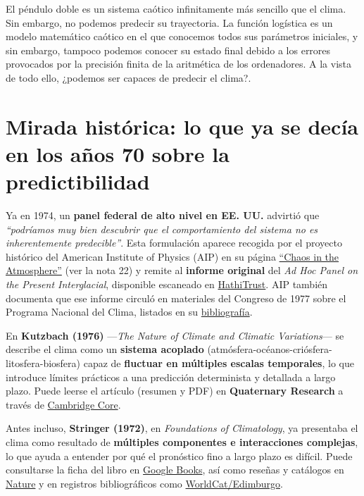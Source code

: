 \documentclass[
  10pt,
  a4paper,
  DIV=11,
  numbers=noendperiod,
  open=any]{scrreprt}
\numberwithin{equation}{chapter}
\numberwithin{equation}{section}
\renewcommand{\[}{\begin{equation}}
\renewcommand{\]}{\end{equation}}
\begin{document}
El péndulo doble es un sistema caótico infinitamente más sencillo que el
clima. Sin embargo, no podemos predecir su trayectoria. La función
logística es un modelo matemático caótico en el que conocemos todos sus
parámetros iniciales, y sin embargo, tampoco podemos conocer su estado
final debido a los errores provocados por la precisión finita de la
aritmética de los ordenadores. A la vista de todo ello, ¿podemos ser
capaces de predecir el clima?.

\section{Mirada histórica: lo que ya se decía en los años 70 sobre la
predictibilidad}\label{mirada-histuxf3rica-lo-que-ya-se-decuxeda-en-los-auxf1os-70-sobre-la-predictibilidad}

Ya en 1974, un \textbf{panel federal de alto nivel en EE. UU.} advirtió
que \emph{``podríamos muy bien descubrir que el comportamiento del
sistema no es inherentemente predecible''}. Esta formulación aparece
recogida por el proyecto histórico del American Institute of Physics
(AIP) en su página
\href{https://history.aip.org/climate/chaos.htm}{``Chaos in the
Atmosphere''} (ver la nota 22) y remite al \textbf{informe original} del
\emph{Ad Hoc Panel on the Present Interglacial}, disponible escaneado en
\href{https://babel.hathitrust.org/cgi/pt?id=uc1.31822000471953}{HathiTrust}.
AIP también documenta que ese informe circuló en materiales del Congreso
de 1977 sobre el Programa Nacional del Clima, listados en su
\href{https://history.aip.org/climate/bib.htm}{bibliografía}.

En \textbf{Kutzbach (1976)} ---\emph{The Nature of Climate and Climatic
Variations}--- se describe el clima como un \textbf{sistema acoplado}
(atmósfera-océanos-criósfera-litosfera-biosfera) capaz de
\textbf{fluctuar en múltiples escalas temporales}, lo que introduce
límites prácticos a una predicción determinista y detallada a largo
plazo. Puede leerse el artículo (resumen y PDF) en \textbf{Quaternary
Research} a través de
\href{https://www.cambridge.org/core/services/aop-cambridge-core/content/view/66CAC8CC9924C70498DFFD08287437FB/S0033589400035560a.pdf/nature_of_climate_and_climatic_variations1.pdf}{Cambridge
Core}.

Antes incluso, \textbf{Stringer (1972)}, en \emph{Foundations of
Climatology}, ya presentaba el clima como resultado de \textbf{múltiples
componentes e interacciones complejas}, lo que ayuda a entender por qué
el pronóstico fino a largo plazo es difícil. Puede consultarse la ficha
del libro en
\href{https://books.google.com/books/about/Foundations_of_Climatology_an_Introducti.html?id=_BROwAEACAAJ}{Google
Books}, así como reseñas y catálogos en
\href{https://www.nature.com/articles/239472a0}{Nature} y en registros
bibliográficos como
\href{https://discovered.ed.ac.uk/discovery/fulldisplay?adaptor=Local+Search+Engine&context=L&docid=alma99260793502466&lang=en&tab=Everything&vid=44UOE_INST\%3A44UOE_VU2}{WorldCat/Edimburgo}.
\end{document}
